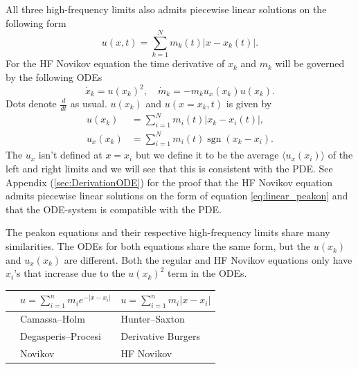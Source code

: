 \documentclass[english,master]{liumaiex}
\theoremstyle{plain}
\theoremstyle{definition}
\DeclareMathOperator{\sgn}{sgn}
\begin{document}
All three high-frequency limits also admits piecewise linear solutions on the following form
\begin{equation} \label{eq:linear_peakon}
	u(x, t) = \sum_{k = 1}^{N} m_k(t) |x - x_k(t)|.
\end{equation}
For the HF Novikov equation the time derivative of $x_k$ and $m_k$ will be governed by the following ODEs
\begin{equation} \label{eq:peakon_odes}
\dot{x}_k = u(x_k)^2, \quad
\dot{m}_k = -m_ku_x(x_k)u(x_k).
\end{equation}
Dots denote $\frac{d}{dt}$ as usual. $u(x_k)$ and $u(x = x_k,t)$ is given by
\begin{align}
	u(x_k) &= \sum_{i = 1}^{N} m_i(t) |x_k - x_i(t)|, \\
	u_x(x_k) &= \sum_{i = 1}^{N} m_i(t) \sgn(x_k - x_i).
\end{align}
The $u_x$ isn't defined at $x = x_i$ but we define it to be the average $\langle u_x(x_i) \rangle$ of the left and right limits and we will see that this is consistent with the PDE.  See Appendix (\ref{sec:DerivationODE}) for the proof that the HF Novikov equation admits piecewise linear solutions on the form of equation \eqref{eq:linear_peakon} and that the ODE-system is compatible with the PDE.

The peakon equations and their respective high-frequency limits share many similarities. The ODEs for both equations share the same form, but the $u(x_k)$ and $u_x(x_k)$ are different. Both the regular and HF Novikov equations only have $x_i$'s that increase due to the $u(x_k)^2$ term in the ODEs.
\begin{center}
  \begin{tabular}{l|c|c}
    & $u=\sum_{i=1}^n m_i e^{-|x-x_i|}$ & $u=\sum_{i=1}^n m_i |x-x_i|$ \\[3pt]
    \hline
    \makecell[l]{
	$\begin{aligned}
		\dot{x}_i &= u(x_k),\\
		\dot{m}_i &= -\phantom{2}m_i u_x(m_i)
	\end{aligned}$}
	& \multicolumn{1}{l|}{Camassa--Holm} & \multicolumn{1}{l}{Hunter--Saxton} \\
    \hline
    \makecell[l]{
	$\begin{aligned}
		\dot{x}_i &= u(x_k),\\
		\dot{m}_i &= -2m_i u_x(m_i)
	\end{aligned}$}
	& \multicolumn{1}{l|}{Degasperis--Procesi} & \multicolumn{1}{l}{Derivative Burgers} \\
    \hline
    \makecell[l]{
	$\begin{aligned}
		\dot{x}_i &= u(x_k)^2,\\
		\dot{m}_i &= -\phantom{2}m_i u_x(m_i) u(x_i)
	\end{aligned}$}
	& \multicolumn{1}{l|}{Novikov} & \multicolumn{1}{l}{HF Novikov} \\
  \end{tabular}
\end{center}
\end{document}
